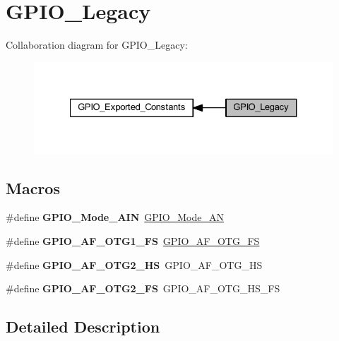 \hypertarget{group___g_p_i_o___legacy}{}\section{G\+P\+I\+O\+\_\+\+Legacy}
\label{group___g_p_i_o___legacy}
Collaboration diagram for G\+P\+I\+O\+\_\+\+Legacy\+:
\nopagebreak
\begin{figure}[H]
\begin{center}
\leavevmode
\includegraphics[width=327pt]{group___g_p_i_o___legacy}
\end{center}
\end{figure}
\subsection*{Macros}
\begin{DoxyCompactItemize}
\item 
\mbox{\label{group___g_p_i_o___legacy_gadf4dafa8caa4e91d2bee996c4bfdf8cc}} 
\#define {\bfseries G\+P\+I\+O\+\_\+\+Mode\+\_\+\+A\+IN}~\hyperlink{group___g_p_i_o_gga1347339e1c84a196fabbb31205eec5d4a6e5c0d7e6d2e22b834b24e1ca1d6d0db}{G\+P\+I\+O\+\_\+\+Mode\+\_\+\+AN}
\item 
\mbox{\label{group___g_p_i_o___legacy_gaddd737997abcd1154c0998b22333b579}} 
\#define {\bfseries G\+P\+I\+O\+\_\+\+A\+F\+\_\+\+O\+T\+G1\+\_\+\+FS}~\hyperlink{group___g_p_i_o___alternat__function__selection__define_gaeba0aeefec841e505170efc7762ae588}{G\+P\+I\+O\+\_\+\+A\+F\+\_\+\+O\+T\+G\+\_\+\+FS}
\item 
\mbox{\label{group___g_p_i_o___legacy_ga54715298b3dc7e843429fd3e24d42cd4}} 
\#define {\bfseries G\+P\+I\+O\+\_\+\+A\+F\+\_\+\+O\+T\+G2\+\_\+\+HS}~G\+P\+I\+O\+\_\+\+A\+F\+\_\+\+O\+T\+G\+\_\+\+HS
\item 
\mbox{\label{group___g_p_i_o___legacy_ga85e574d8321b9d9aaa2790351b4f0c1e}} 
\#define {\bfseries G\+P\+I\+O\+\_\+\+A\+F\+\_\+\+O\+T\+G2\+\_\+\+FS}~G\+P\+I\+O\+\_\+\+A\+F\+\_\+\+O\+T\+G\+\_\+\+H\+S\+\_\+\+FS
\end{DoxyCompactItemize}


\subsection{Detailed Description}
